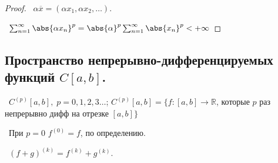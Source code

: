 \begin{proof}
\par\noindent \textbullet~$\alpha \overline{x} = (\alpha x_1, \alpha x_2, \dots)$. 

\smallskip
\noindent \textbullet~$\sum_{n = 1}^{\infty} \abs{\alpha x_n}^p =
\abs{\alpha}^p \sum_{n = 1}^{\infty}\abs{x_n}^p < +\infty$
\end{proof}

\subsection*{Пространство непрерывно-дифференцируемых функций $C[a, b]$.}

\noindent \textbullet~$C^{(p)}[a, b], \; p = 0, 1, 2, 3 \dots$;
$C^{(p)}[a, b] = \{ f : [a, b] \rightarrow \mathbb{R}$, которые $p$ раз непрерывно дифф на отрезке $[a, b]$$\}$

\medskip
\noindent \textbullet~При $p = 0$ $f^{(0)} = f$, по определению.

\smallskip
\noindent \textbullet~$(f + g)^{(k)} = f^{(k)} + g^{(k)}$.
